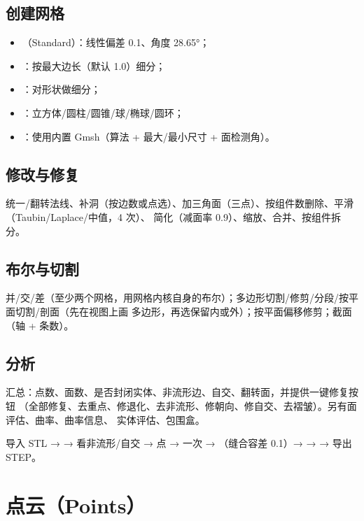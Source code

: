 \subsection{创建网格}

\begin{itemize}
  \item {}（Standard）：线性偏差 0.1、角度 28.65°；
  \item {}：按最大边长（默认 1.0）细分；
  \item {}：对形状做细分；
  \item {}：立方体/圆柱/圆锥/球/椭球/圆环；
  \item {}：使用内置 Gmsh（算法 + 最大/最小尺寸 + 面检测角）。
\end{itemize}

\subsection{修改与修复}

统一/翻转法线、补洞（按边数或点选）、加三角面（三点）、按组件数删除、平滑（Taubin/Laplace/中值，4 次）、
简化（减面率 0.9）、缩放、合并、按组件拆分。

\subsection{布尔与切割}

并/交/差（至少两个网格，用网格内核自身的布尔）；多边形切割/修剪/分段/按平面切割/剖面（先在视图上画
多边形，再选保留内或外）；按平面偏移修剪；截面（轴 + 条数）。

\subsection{分析}

 汇总：点数、面数、是否封闭实体、非流形边、自交、翻转面，并提供一键修复按钮
（全部修复、去重点、修退化、去非流形、修朝向、修自交、去褶皱）。另有面评估、曲率、曲率信息、
实体评估、包围盒。

\begin{practice}
导入 STL →  → 看非流形/自交 → 点  →  一次 →
（缝合容差 0.1）→  →  → 导出 STEP。
\end{practice}

\section{点云（Points）}

